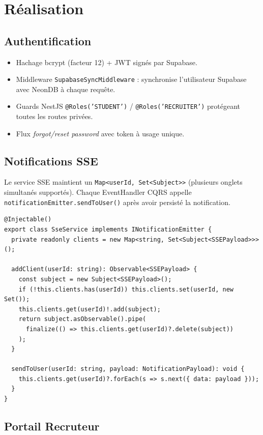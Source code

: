 ﻿\documentclass[12pt,a4paper]{report}
\begin{document}
\section{Réalisation}

\subsection{Authentification}
\begin{itemize}
  \item Hachage bcrypt (facteur 12) + \ac{JWT} signés par Supabase.
  \item Middleware \texttt{SupabaseSyncMiddleware} : synchronise l'utilisateur Supabase avec NeonDB à chaque requête.
  \item Guards NestJS \texttt{@Roles('STUDENT')} / \texttt{@Roles('RECRUITER')} protégeant toutes les routes privées.
  \item Flux \textit{forgot/reset password} avec token à usage unique.
\end{itemize}

\subsection{Notifications SSE}
Le service SSE maintient un \texttt{Map<userId, Set<Subject>>} (plusieurs onglets simultanés supportés). Chaque EventHandler CQRS appelle \texttt{notificationEmitter.sendToUser()} après avoir persisté la notification.

\begin{lstlisting}[style=ts, caption={SseService — diffusion multi-onglets}]
@Injectable()
export class SseService implements INotificationEmitter {
  private readonly clients = new Map<string, Set<Subject<SSEPayload>>>();

  addClient(userId: string): Observable<SSEPayload> {
    const subject = new Subject<SSEPayload>();
    if (!this.clients.has(userId)) this.clients.set(userId, new Set());
    this.clients.get(userId)!.add(subject);
    return subject.asObservable().pipe(
      finalize(() => this.clients.get(userId)?.delete(subject))
    );
  }

  sendToUser(userId: string, payload: NotificationPayload): void {
    this.clients.get(userId)?.forEach(s => s.next({ data: payload }));
  }
}
\end{lstlisting}

\subsection{Portail Recruteur}
\end{document}
